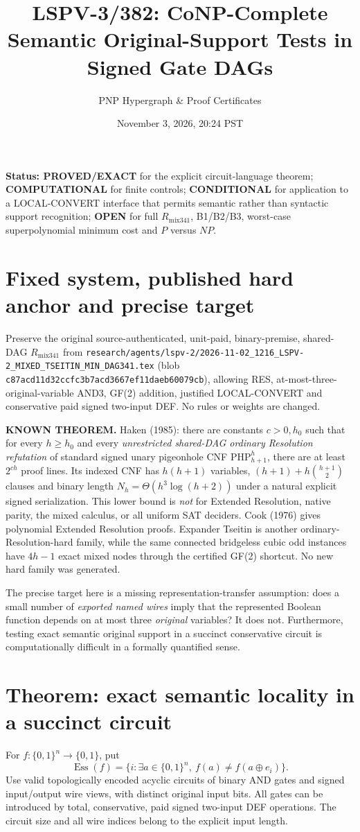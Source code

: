 \documentclass[11pt]{article}
\title{LSPV-3/382: CoNP-Complete Semantic Original-Support Tests in Signed Gate DAGs}
\author{PNP Hypergraph \& Proof Certificates}
\date{November 3, 2026, 20:24 PST}
\begin{document}
\maketitle
\noindent\textbf{Status: PROVED/EXACT} for the explicit circuit-language theorem; \textbf{COMPUTATIONAL} for finite controls; \textbf{CONDITIONAL} for application to a LOCAL-CONVERT interface that permits semantic rather than syntactic support recognition; \textbf{OPEN} for full $R_{\mathrm{mix341}}$, B1/B2/B3, worst-case superpolynomial minimum cost and $P$ versus $NP$.

\section*{Fixed system, published hard anchor and precise target}
Preserve the original source-authenticated, unit-paid, binary-premise, shared-DAG $R_{\mathrm{mix341}}$ from
\texttt{research/agents/lspv-2/2026-11-02\_1216\_LSPV-2\_MIXED\_TSEITIN\_MIN\_DAG341.tex}
(blob \texttt{c87acd11d32ccfc3b7acd3667ef11daeb60079cb}), allowing RES, at-most-three-original-variable AND3, GF(2) addition, justified LOCAL-CONVERT and conservative paid signed two-input DEF. No rules or weights are changed.

\textbf{KNOWN THEOREM.} Haken (1985): there are constants $c>0,h_0$ such that for every $h\ge h_0$ and every \emph{unrestricted shared-DAG ordinary Resolution refutation} of standard signed unary pigeonhole CNF $\mathrm{PHP}_{h+1}^{h}$, there are at least $2^{ch}$ proof lines. Its indexed CNF has $h(h+1)$ variables, $(h+1)+h\binom{h+1}{2}$ clauses and binary length $N_h=\Theta(h^3\log(h+2))$ under a natural explicit signed serialization. This lower bound is \emph{not} for Extended Resolution, native parity, the mixed calculus, or all uniform SAT deciders. Cook (1976) gives polynomial Extended Resolution proofs. Expander Tseitin is another ordinary-Resolution-hard family, while the same connected bridgeless cubic odd instances have $4h-1$ exact mixed nodes through the certified GF(2) shortcut. No new hard family was generated.

The precise target here is a missing representation-transfer assumption: does a small number of \emph{exported named wires} imply that the represented Boolean function depends on at most three \emph{original} variables? It does not. Furthermore, testing exact semantic original support in a succinct conservative circuit is computationally difficult in a formally quantified sense.

\section*{Theorem: exact semantic locality in a succinct circuit}
For $f:\{0,1\}^n\to\{0,1\}$, put
\[
\operatorname{Ess}(f)=\{i:\exists a\in\{0,1\}^n,\ 
 f(a)\ne f(a\oplus e_i)\}.
\]
Use valid topologically encoded acyclic circuits of binary AND gates and signed input/output wire views, with distinct original input bits. All gates can be introduced by total, conservative, paid signed two-input DEF operations. The circuit size and all wire indices belong to the explicit input length.
\end{document}
